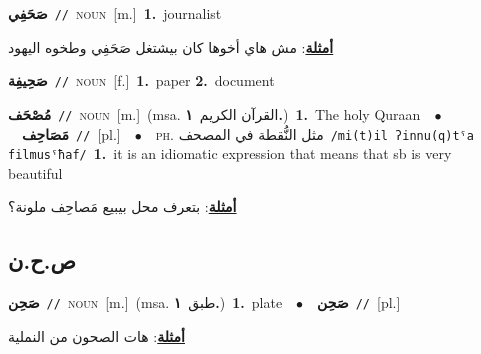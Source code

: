 \documentclass[10pt,a4paper,twoside]{article} %
\begin{document}
\begin{multicols}{2}
{{{{{{{{{{{\setlength\topsep{0pt}\textbf{\foreignlanguage{arabic}{صَحَفِي}}\ {\color{gray}\texttt{//}\color{black}}\ \textsc{noun}\ [m.]\ \textbf{1.}~journalist\  \begin{flushright}\color{gray}\foreignlanguage{arabic}{\textbf{\underline{\foreignlanguage{arabic}{أمثلة}}}: مش هاي أخوها كان بيشتغل صَحَفِي وطخوه اليهود}\end{flushright}\color{black}} \vspace{2mm}

{\setlength\topsep{0pt}\textbf{\foreignlanguage{arabic}{صَحِيفِة}}\ {\color{gray}\texttt{//}\color{black}}\ \textsc{noun}\ [f.]\ \textbf{1.}~paper  \textbf{2.}~document\ 

{\setlength\topsep{0pt}\textbf{\foreignlanguage{arabic}{مُصْحَف}}\ {\color{gray}\texttt{//}\color{black}}\ \textsc{noun}\ [m.]\ \color{gray}(msa. \foreignlanguage{arabic}{القرآن الكريم}~\foreignlanguage{arabic}{\textbf{١.}})\color{black}\ \textbf{1.}~The holy Quraan\ \ $\bullet$\ \ \setlength\topsep{0pt}\textbf{\foreignlanguage{arabic}{مَصَاحِف}}\ {\color{gray}\texttt{//}\color{black}}\ [pl.]\ \ $\bullet$\ \ \textsc{ph.} \color{gray} \foreignlanguage{arabic}{مثل النُّقطة في المصحف}\color{black}\ {\color{gray}\texttt{/{\sffamily mi(t)il ʔinnu(q)tˤa filmusˤħaf}/}\color{black}}\ \textbf{1.}~it is an idiomatic expression that means that sb is very beautiful\  \begin{flushright}\color{gray}\foreignlanguage{arabic}{\textbf{\underline{\foreignlanguage{arabic}{أمثلة}}}: بتعرف محل بيبيع مَصاحِف ملونة؟}\end{flushright}\color{black}} \vspace{2mm}

\vspace{-3mm}
\subsection*{\color{blue}\foreignlanguage{arabic}{ص.ح.ن}\color{blue}{}} 

{\setlength\topsep{0pt}\textbf{\foreignlanguage{arabic}{صَحِن}}\ {\color{gray}\texttt{//}\color{black}}\ \textsc{noun}\ [m.]\ \color{gray}(msa. \foreignlanguage{arabic}{طبق}~\foreignlanguage{arabic}{\textbf{١.}})\color{black}\ \textbf{1.}~plate\ \ $\bullet$\ \ \setlength\topsep{0pt}\textbf{\foreignlanguage{arabic}{صَحِن}}\ {\color{gray}\texttt{//}\color{black}}\ [pl.]\  \begin{flushright}\color{gray}\foreignlanguage{arabic}{\textbf{\underline{\foreignlanguage{arabic}{أمثلة}}}: هات الصحون من النملية}\end{flushright}\color{black}} \vspace{2mm}

}}}}}}}}}}}
\end{multicols}
\end{document}
